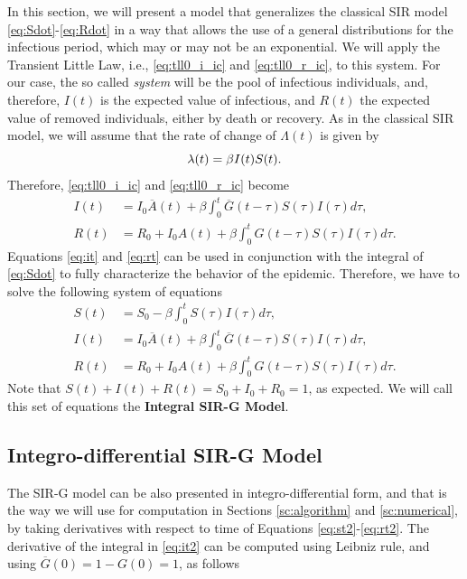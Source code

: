 \documentclass[USenglish,10pt]{article}
\newcommand{\ie}{i.e.\xspace}
\newcommand{\Ab}{\overline{A}\xspace}
\newcommand{\Gb}{\overline{G}\xspace}
\newcommand{\la}{\ensuremath\lambda\xspace}
\begin{document}
In this section, we will present a model that generalizes the classical SIR model \eqref{eq:Sdot}-\eqref{eq:Rdot} in a way that allows the use of a general distributions for the infectious period, which may or may not be an exponential.
We will apply the Transient Little Law, \ie, \eqref{eq:tll0_i_ic} and \eqref{eq:tll0_r_ic}, to this system.
For our case, the so called \emph{system} will be the pool of infectious individuals, and, therefore, $I(t)$ is the expected value of infectious, and $R(t)$ the expected value of removed individuals, either by death or recovery.
As in the classical SIR model, we will assume that the rate of change of $\Lambda(t)$ is given by
\begin{equation}
\la(t) = \beta I(t)S(t).
\label{eq:dM}
\end{equation}
Therefore, \eqref{eq:tll0_i_ic} and \eqref{eq:tll0_r_ic} become
\begin{align}
	I(t) &= I_0\Ab(t) + \beta\int_0^t \Gb(t-\tau) S(\tau)I(\tau)d\tau,   \label{eq:it} \\
	R(t) &= R_0 + I_0A(t) + \beta\int_0^t G(t-\tau) S(\tau)I(\tau)d\tau.   \label{eq:rt}
\end{align}
Equations \eqref{eq:it} and \eqref{eq:rt} can be used in conjunction with the integral of \eqref{eq:Sdot} to fully characterize the behavior of the epidemic. Therefore, we have to solve the following system of equations
\begin{subequations}
\begin{align}
S(t) &= S_0 - \beta\int_0^t  S(\tau)I(\tau)d\tau, \label{eq:st2} \\
I(t) &= I_0 \Ab(t) + \beta\int_0^t \Gb(t-\tau) S(\tau)I(\tau)d\tau, \label{eq:it2} \\
R(t) &= R_0  + I_0A(t) +  \beta\int_0^t G(t-\tau) S(\tau)I(\tau)d\tau.   \label{eq:rt2}
\end{align}
\end{subequations}
Note that $S(t)+I(t)+R(t)=S_0+I_0+R_0=1$, as expected. We will call this set of equations the \textbf{Integral SIR-G Model}.


\subsection{Integro-differential SIR-G Model}

The SIR-G model can be also presented in integro-differential form, and that is the way we will use for computation in Sections \ref{sc:algorithm} and \ref{sc:numerical}, by taking derivatives with respect to time of Equations \eqref{eq:st2}-\eqref{eq:rt2}. The derivative of the integral in \eqref{eq:it2} can be computed using Leibniz rule, and using $\Gb(0)=1-G(0)=1$, as follows
\end{document}

